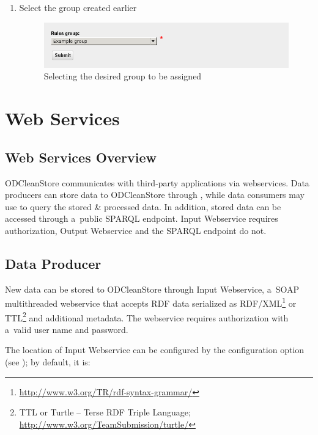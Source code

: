 {\begin{enumerate}[resume]
	\item Select the group created earlier

\begin{figure}[!ht]
    \centering
    \includegraphics[width=\textwidth]{images/fe-walkthrough-new-group-assignment.png}
    \caption{Selecting the desired group to be assigned}
	\label{fig:feWTNewGroupAssignment}
\end{figure}

\end{enumerate}


\chapter{Web Services}
\section{Web Services Overview}
ODCleanStore communicates with third-party applications via webservices. Data producers can store data to ODCleanStore through , while data consumers may use  to query the stored \& processed data. In addition, stored data can be accessed through a~public SPARQL endpoint. Input Webservice requires authorization, Output Webservice and the SPARQL endpoint do not.

\section{Data Producer}
\label{sec:inputWS}

New data can be stored to ODCleanStore through Input Webservice, a~SOAP multithreaded webservice that accepts RDF data serialized as RDF/XML\footnote{\url{http://www.w3.org/TR/rdf-syntax-grammar/}} or TTL\footnote{TTL or Turtle -- Terse RDF Triple Language; \url{http://www.w3.org/TeamSubmission/turtle/}} and additional metadata. The webservice requires authorization with a~valid user name and password.

The location of Input Webservice can be configured by the  configuration option (see ); by default, it is:
\begin{center}
\end{center}

}

